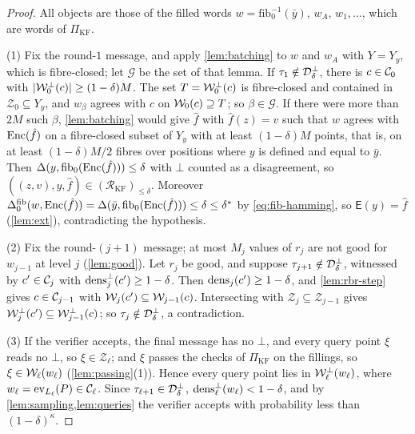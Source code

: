 \begin{proof}
All objects are those of the filled words $w = \mathrm{fib}_0^{-1}(\bar y)$, $w_A$, $w_1, \dots$, which are words of $\Pi_{\mathrm{KF}}$.

(1) Fix the round-$1$ message, and apply \cref{lem:batching} to $w$ and $w_A$ with $Y = Y_y$, which is fibre-closed; let $\mathcal{G}$ be the set of that lemma.
If $\tau_1 \notin \mathcal{D}^\bot_\delta$, there is $c \in \mathcal{C}_0$ with $|\mathcal{W}^\bot_0(c)| \ge (1-\delta)M$. The set $T = \mathcal{W}^\bot_0(c)$ is fibre-closed and contained in $\mathcal{Z}_0 \subseteq Y_y$, and $w_\beta$ agrees with $c$ on $\mathcal{W}_0(c) \supseteq T$; so $\beta \in \mathcal{G}$.
If there were more than $2M$ such $\beta$, \cref{lem:batching} would give $\hat f$ with $\hat f(z) = v$ such that $w$ agrees with $\mathrm{Enc}(\hat f)$ on a fibre-closed subset of $Y_y$ with at least $(1-\delta)M$ points, that is, on at least $(1-\delta)M/2$ fibres over positions where $y$ is defined and equal to $\bar y$. Then $\Delta(y, \mathrm{fib}_0(\mathrm{Enc}(\hat f))) \le \delta$ with $\bot$ counted as a disagreement, so $((z,v), y, \hat f) \in (\mathcal{R}_{\mathrm{KF}})_{\le\delta}$.
Moreover $\Delta^{\mathrm{fib}}_0(w, \mathrm{Enc}(\hat f)) = \Delta(\bar y, \mathrm{fib}_0(\mathrm{Enc}(\hat f))) \le \delta \le \delta^*$ by \eqref{eq:fib-hamming}, so $\mathsf{E}(y) = \hat f$ (\cref{lem:ext}), contradicting the hypothesis.

(2) Fix the round-$(j+1)$ message; at most $M_j$ values of $r_j$ are not good for $w_{j-1}$ at level $j$ (\cref{lem:good}).
Let $r_j$ be good, and suppose $\tau_{j+1} \notin \mathcal{D}^\bot_\delta$, witnessed by $c' \in \mathcal{C}_j$ with $\mathrm{dens}^\bot_j(c') \ge 1-\delta$. Then $\mathrm{dens}_j(c') \ge 1-\delta$, and \cref{lem:rbr-step} gives $c \in \mathcal{C}_{j-1}$ with $\mathcal{W}_j(c') \subseteq \mathcal{W}_{j-1}(c)$.
Intersecting with $\mathcal{Z}_j \subseteq \mathcal{Z}_{j-1}$ gives $\mathcal{W}^\bot_j(c') \subseteq \mathcal{W}^\bot_{j-1}(c)$; so $\tau_j \notin \mathcal{D}^\bot_\delta$, a contradiction.

(3) If the verifier accepts, the final message has no $\bot$, and every query point $\xi$ reads no $\bot$, so $\xi \in \mathcal{Z}_\ell$; and $\xi$ passes the checks of $\Pi_{\mathrm{KF}}$ on the fillings, so $\xi \in \mathcal{W}_\ell(w_\ell)$ (\cref{lem:passing}(1)). Hence every query point lies in $\mathcal{W}^\bot_\ell(w_\ell)$, where $w_\ell = \mathrm{ev}_{L_\ell}(P) \in \mathcal{C}_\ell$.
Since $\tau_{\ell+1} \in \mathcal{D}^\bot_\delta$, $\mathrm{dens}^\bot_\ell(w_\ell) < 1-\delta$, and by \cref{lem:sampling,lem:queries} the verifier accepts with probability less than $(1-\delta)^\kappa$.
\end{proof}

